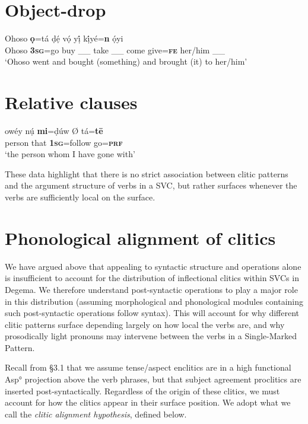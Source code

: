 \documentclass[output=paper]{langsci/langscibook}
\begin{document}
\chapter[Object{}-drop]{Object-drop}
\label{bkm:Ref449460495}\gll Ohoso \textbf{  ọ}=tá   ḍẹ́     vọ́     yị́    kị́yé=\textbf{n }  ọ́yi\\
     Ohoso   \textbf{3}\textbf{\textsc{sg}}=go   buy   \_\_  take \_\_  come   give=\textbf{\textsc{fe}}  her/him  \_\_\\
\glt ‘Ohoso went and bought (something) and brought (it) to her/him’ \citep[121]{Kari2004}
\z

\chapter[Relative clauses ]{Relative clauses }
\label{bkm:Ref449460499}\gll owéy     nụ́     \textbf{mi}=ḍúw\textbf{     }Ø\textbf{  }tá=\textbf{t\={e}}\\
     person    that    \textbf{\textsc{1sg}}=follow    go=\textbf{\textsc{prf}}\\
\glt ‘the person whom I have gone with’
\z

These data highlight that there is no strict association between clitic patterns and the argument structure of verbs in a SVC, but rather surfaces whenever the verbs are sufficiently local on the surface. 

\chapter{Phonological alignment of clitics }

We have argued above that appealing to syntactic structure and operations alone is insufficient to account for the distribution of inflectional clitics within SVCs in Degema. We therefore understand post-syntactic operations to play a major role in this distribution (assuming morphological and phonological modules containing such post-syntactic operations follow syntax). This will account for why different clitic patterns surface depending largely on how local the verbs are, and why prosodically light pronouns may intervene between the verbs in a Single-Marked Pattern. 

Recall from §3.1 that we assume tense/aspect enclitics are in a high functional Asp° projection above the verb phrases, but that subject agreement proclitics are inserted post-syntactically. Regardless of the origin of these clitics, we must account for how the clitics appear in their surface position. We adopt what we call the \textit{clitic alignment hypothesis}, defined below. 
\end{document}
